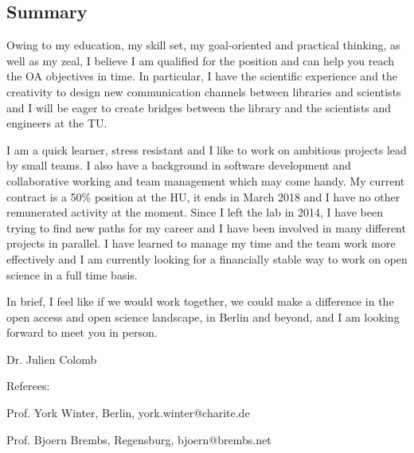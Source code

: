 \subsection*{Summary}
Owing to my education, my skill set, my goal-oriented and practical thinking, as well as my zeal, I believe I am qualified for the position and can help you reach the OA objectives in time. In particular, I have the scientific experience and the creativity to design new communication channels between libraries and scientists and I will be eager to create bridges between the library and the scientists and engineers at the TU.

 

I am  a quick learner, stress resistant and I like to work on ambitious projects lead by small teams. I also have a background in software development and collaborative working and team management which may come handy. My current contract is a 50\% position at the HU, it ends in March 2018 and I have no other remunerated activity at the moment. 
Since I left the lab in 2014, I have been trying to find new paths for my career and I have been involved in many different projects in parallel. I have learned to manage my time and the team work more effectively and I am currently looking for a financially stable way to work on open science in a full time basis. 

In brief, I feel like if we would work together, we could make a difference in the open access and open science landscape, in Berlin and beyond,
and I am looking forward to meet you in person.


Dr. Julien Colomb



\vspace {1.5cm} 

Referees:

Prof. York Winter, Berlin, york.winter@charite.de
 
 
Prof. Bjoern Brembs, Regensburg, bjoern@brembs.net
